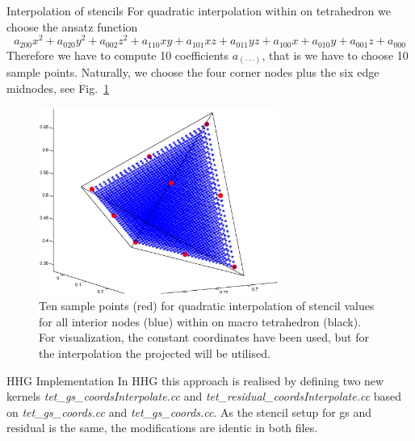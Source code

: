 \documentclass[a4paper,11pt,reqno]{amsart}
\numberwithin{figure}{section}
\numberwithin{table}{section}
\numberwithin{figure}{subsection}
\begin{document}

\begin{section}{Interpolation of stencils}
For quadratic interpolation within on tetrahedron we choose the ansatz function
\begin{equation}
\label{eq:quadraticPolynomial}
a_{200}x^2 + a_{020}y^2 + a_{002}z^2 + a_{110}xy + a_{101}xz + a_{011}yz + 
a_{100}x + a_{010}y + a_{001}z + a_{000}
\end{equation}
Therefore we have to compute 10 coefficients $a_{(\cdot\cdot\cdot)}$, that is we
have to choose 10 sample points. Naturally, we choose the four corner nodes plus the six
edge midnodes, see Fig.~\ref{fig:samplePoints}

\begin{figure}\centering
\includegraphics[width=0.7\textwidth]{pics/tetSamplePoints} 
\caption{Ten sample points (red) for quadratic interpolation of stencil values for 
all interior nodes (blue) within on macro tetrahedron (black). For visualization,
the constant coordinates have been used, but for the interpolation the projected
will be utilised.}
\label{fig:samplePoints}
\end{figure}  


\begin{subsection}{HHG Implementation}
In HHG this approach is realised by defining two new kernels 
\emph{tet\_gs\_coordsInterpolate.cc}
and \emph{tet\_residual\_coordsInterpolate.cc} based on \emph{tet\_gs\_coords.cc} and 
\emph{tet\_gs\_coords.cc}. As the stencil setup for gs and residual is the same, 
the modifications are identic in both files.


\end{subsection}
\end{section}
\end{document}
